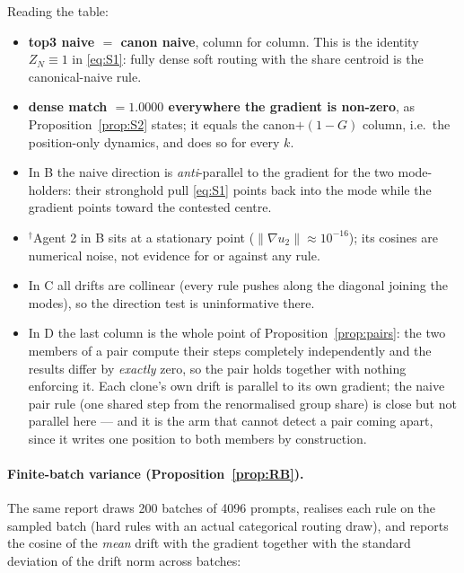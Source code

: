 \documentclass[11pt]{article}
\theoremstyle{remark}
\begin{document}
\noindent Reading the table:
\begin{itemize}
\item \textbf{top3 naive $=$ canon naive}, column for column. This is the
  identity $Z_N\equiv1$ in \eqref{eq:S1}: fully dense soft routing with the
  share centroid is the canonical-naive rule.
\item \textbf{dense match $=1.0000$ everywhere the gradient is non-zero},
  as Proposition~\ref{prop:S2} states; it equals the canon$+(1-G)$ column,
  i.e.\ the position-only dynamics, and does so for every $k$.
\item In B the naive direction is \emph{anti}-parallel to the gradient for
  the two mode-holders: their stronghold pull \eqref{eq:S1} points back
  into the mode while the gradient points toward the contested centre.
\item $^{\dagger}$Agent 2 in B sits at a stationary point
  ($\|\nabla u_2\|\approx10^{-16}$); its cosines are numerical noise, not
  evidence for or against any rule.
\item In C all drifts are collinear (every rule pushes along the diagonal
  joining the modes), so the direction test is uninformative there.
\item In D the last column is the whole point of Proposition~\ref{prop:pairs}:
  the two members of a pair compute their steps completely independently
  and the results differ by \emph{exactly} zero, so the pair holds together
  with nothing enforcing it. Each clone's own drift is parallel to its own
  gradient; the naive pair rule (one shared step from the renormalised
  group share) is close but not parallel here --- and it is the arm that
  cannot detect a pair coming apart, since it writes one position to both
  members by construction.
\end{itemize}

\paragraph{Finite-batch variance (Proposition~\ref{prop:RB}).}
The same report draws 200 batches of 4096 prompts, realises each rule on the
sampled batch (hard rules with an actual categorical routing draw), and
reports the cosine of the \emph{mean} drift with the gradient together with
the standard deviation of the drift norm across batches:
\end{document}

